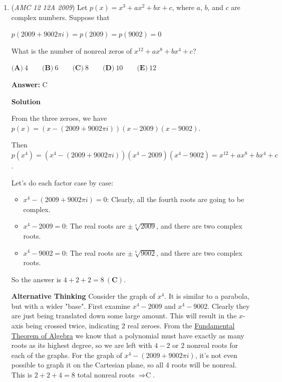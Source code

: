 \begin{enumerate}
	\item (\textit{AMC 12 12A 2009}) Let $p(x) = x^3 + ax^2 + bx + c$, where $a$, $b$, and $c$ are complex numbers.  Suppose that


 $p(2009 + 9002\pi i) = p(2009) = p(9002) = 0$

 What is the number of nonreal zeros of $x^{12} + ax^8 + bx^4 + c$?


 $\textbf{(A)}\ 4\qquad \textbf{(B)}\ 6\qquad \textbf{(C)}\ 8\qquad \textbf{(D)}\ 10\qquad \textbf{(E)}\ 12$

 \textbf{Answer: }C



\textbf{Solution}

From the three zeroes, we have $p(x) = (x - (2009 + 9002\pi i))(x - 2009)(x - 9002)$.

 Then $p(x^4) = (x^4 - (2009 + 9002\pi i))(x^4 - 2009)(x^4 - 9002)=x^{12}+ax^8+bx^4+c$.

 Let's do each factor case by case:

 
            \begin{itemize}
        \item $x^4 - (2009 + 9002\pi i) = 0$: Clearly, all the fourth roots are going to be complex.
        \item $x^4 - 2009 = 0$: The real roots are $\pm \sqrt [4]{2009}$, and there are two complex roots.
        \item $x^4 - 9002 = 0$: The real roots are $\pm \sqrt [4]{9002}$, and there are two complex roots.
            \end{itemize}
            So the answer is $4 + 2 + 2 = 8\ \mathbf{(C)}$.

 \textbf{Alternative Thinking} Consider the graph of $x^4$. It is similar to a parabola, but with a wider "base". First examine $x^4-2009$ and $x^4-9002$. Clearly they are just being translated down some large amount. This will result in the $x$-axis being crossed twice, indicating $2$ real zeroes. From the \href{https://artofproblemsolving.com/wiki/index.php?title=Fundamental\_Theorem\_of\_Algebra}{Fundamental Theorem of Algebra} we know that a polynomial must have exactly as many roots as its highest degree, so we are left with $4-2$ or $2$ nonreal roots for each of the graphs. For the graph of $x^4-(2009+9002\pi i)$, it's not even possible to graph it on the Cartesian plane, so all $4$ roots will be nonreal. This is $2+2+4 = 8$ total nonreal roots $\Rightarrow \boxed{\text{C}}$.

 



\end{enumerate}

